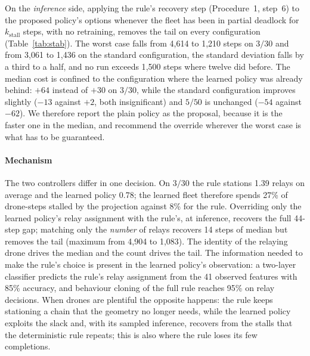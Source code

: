 \documentclass[final,5p,times,twocolumn]{elsarticle}
\begin{document}
On the \emph{inference} side, applying the rule's recovery step (Procedure~1, step~6) to the
proposed policy's options whenever the fleet has been in partial deadlock for
$k_{\mathrm{stall}}$ steps, with no retraining, removes the tail on every configuration
(Table~\ref{tab:stab}). The worst case falls from 4{,}614 to 1{,}210 steps on $3/30$ and from
3{,}061 to 1{,}436 on the standard configuration, the standard deviation falls by a third to a
half, and no run exceeds 1{,}500 steps where twelve did before. The median cost is confined to
the configuration where the learned policy was already behind: $+64$ instead of $+30$ on $3/30$,
while the standard configuration improves slightly ($-13$ against $+2$, both insignificant) and
$5/50$ is unchanged ($-54$ against $-62$). We therefore report the plain policy as the proposal,
because it is the faster one in the median, and recommend the override wherever the worst case is
what has to be guaranteed.

\begin{table}[t]
\centering
\caption{Effect of the deadlock-recovery override applied to the proposed policy at inference,
without retraining. The paired median, wins--losses and $p$ are against the tuned rule on the
same instances; the standard deviation, 90th percentile, maximum and the count above 1{,}500 steps
describe the learned policy's own makespan distribution.}
\label{tab:stab}
\small

\end{table}

\paragraph{Mechanism}
The two controllers differ in one decision. On $3/30$ the rule stations 1.39 relays on
average and the learned policy 0.78; the learned fleet therefore spends 27\% of drone-steps stalled
by the projection against 8\% for the rule. Overriding only the learned policy's relay
assignment with the rule's, at inference, recovers the full 44-step gap; matching only the
\emph{number} of relays recovers 14 steps of median but removes the tail (maximum from 4{,}904 to
1{,}083). The identity of the relaying drone drives the median and the count drives the tail. The
information needed to make the rule's choice is present in the learned policy's observation:
a two-layer classifier predicts the rule's relay assignment from the 41 observed features with
85\% accuracy, and behaviour cloning of the full rule reaches 95\% on relay decisions. When drones
are plentiful the opposite happens: the rule keeps stationing a chain that the geometry no
longer needs, while the learned policy exploits the slack and, with its sampled inference, recovers from
the stalls that the deterministic rule repeats; this is also where the rule loses its few
completions.
\end{document}
